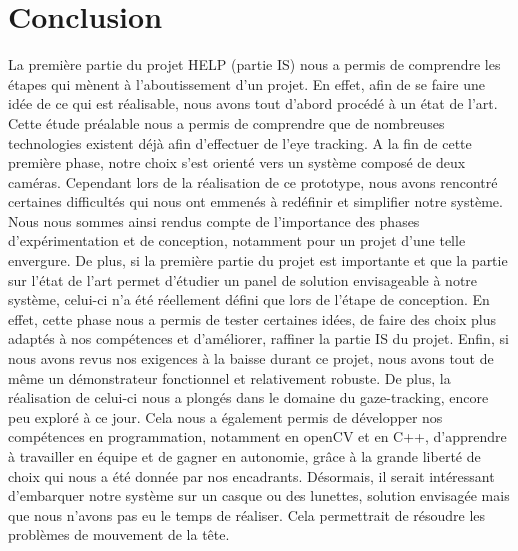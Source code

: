 \section*{Conclusion}

La première partie du projet HELP (partie IS) nous a permis de comprendre les étapes qui mènent à l’aboutissement d’un projet. En effet, afin de se faire une idée de ce qui est réalisable, nous avons tout d’abord procédé à un état de l’art. Cette étude préalable nous a permis de comprendre que de nombreuses technologies existent déjà afin d’effectuer de l’eye tracking. A la fin de cette première phase, notre choix s’est orienté vers un système composé de deux caméras. Cependant lors de la réalisation de ce prototype, nous avons rencontré certaines difficultés qui nous ont emmenés à redéfinir et simplifier notre système. Nous nous sommes ainsi rendus compte de l’importance des phases d’expérimentation et de conception, notamment pour un projet d’une telle envergure. 
\bigbreak
De plus, si la première partie du projet est importante et que la partie sur l’état de l’art permet d’étudier un panel de solution envisageable à notre système, celui-ci n’a été réellement défini que lors de l'étape de conception. En effet, cette phase nous a permis de tester certaines idées, de faire des choix plus adaptés à nos compétences et d’améliorer, raffiner la partie IS du projet.
\bigbreak
Enfin, si nous avons revus nos exigences à la baisse durant ce projet, nous avons tout de même un démonstrateur fonctionnel et relativement robuste. De plus, la réalisation de celui-ci nous a plongés dans le domaine du gaze-tracking, encore peu exploré à ce jour. Cela nous a également permis de développer nos compétences en programmation, notamment en openCV et en C++, d'apprendre à travailler en équipe et de gagner en autonomie, grâce à la grande liberté de choix qui nous a été donnée par nos encadrants. Désormais, il serait intéressant d'embarquer notre système sur un casque ou des lunettes, solution envisagée mais que nous n'avons pas eu le temps de réaliser. Cela permettrait de résoudre les problèmes de mouvement de la tête.
